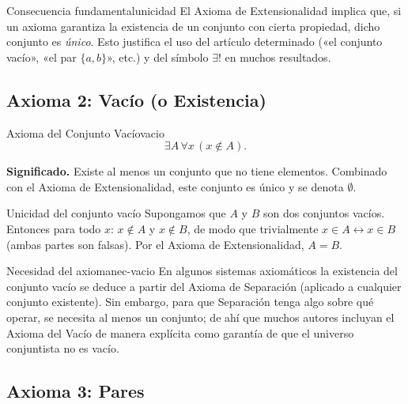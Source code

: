 \begin{observacion}{Consecuencia fundamental}{unicidad}
El Axioma de Extensionalidad implica que, si un axioma garantiza la existencia de un conjunto con cierta propiedad, dicho conjunto es \emph{único}. Esto justifica el uso del artículo determinado («el conjunto vacío», «el par $\{a,b\}$», etc.) y del símbolo $\exists!$ en muchos resultados.
\end{observacion}

\subsection{Axioma 2: Vacío (o Existencia)}

\begin{definicion}{Axioma del Conjunto Vacío}{vacio}
\[
  \exists A\,\forall x\,(x \notin A).
\]
\end{definicion}

\textbf{Significado.} Existe al menos un conjunto que no tiene elementos. Combinado con el Axioma de Extensionalidad, este conjunto es único y se denota $\emptyset$.

\begin{ejemplo}{Unicidad del conjunto vacío}{}
Supongamos que $A$ y $B$ son dos conjuntos vacíos. Entonces para todo $x$: $x \notin A$ y $x \notin B$, de modo que trivialmente $x \in A \leftrightarrow x \in B$ (ambas partes son falsas). Por el Axioma de Extensionalidad, $A = B$.
\end{ejemplo}

\begin{observacion}{Necesidad del axioma}{nec-vacio}
En algunos sistemas axiomáticos la existencia del conjunto vacío se deduce a partir del Axioma de Separación (aplicado a cualquier conjunto existente). Sin embargo, para que Separación tenga algo sobre qué operar, se necesita al menos un conjunto; de ahí que muchos autores incluyan el Axioma del Vacío de manera explícita como garantía de que el universo conjuntista no es vacío.
\end{observacion}

\subsection{Axioma 3: Pares}


